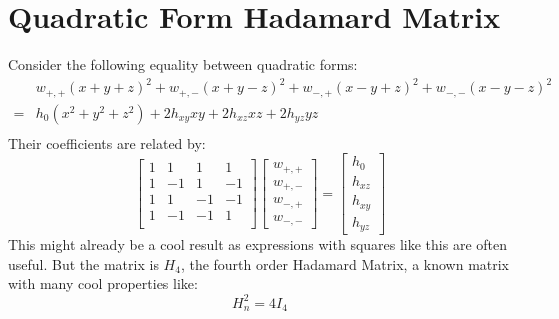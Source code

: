 
\section{Quadratic Form Hadamard Matrix}
Consider the following equality between quadratic forms:
\[\begin{aligned}
	&w_{+,+}(x+y+z)^2+w_{+,-}(x+y-z)^2+w_{-,+}(x-y+z)^2+w_{-,-}(x-y-z)^2\\
	=&h_0(x^2+y^2+z^2)+2h_{xy}xy+2h_{xz}xz+2h_{yz}yz\\
\end{aligned}\]
Their coefficients are related by:
\[
	\begin{bmatrix}1&1&1&1\\1&-1&1&-1\\1&1&-1&-1\\1&-1&-1&1\\\end{bmatrix}
	\begin{bmatrix}w_{+,+}\\w_{+,-}\\w_{-,+}\\w_{-,-}\end{bmatrix}
	=\begin{bmatrix}h_0\\h_{xz}\\h_{xy}\\h_{yz}\end{bmatrix}
\]
This might already be a cool result as expressions with squares like this are often useful.
But the matrix is $H_4$, the fourth order Hadamard Matrix,
a known matrix with many cool properties like:
\[H_n^2=4I_4\]

